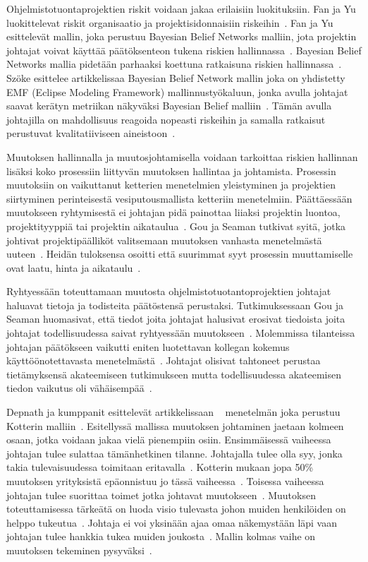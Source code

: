 \documentclass[finnish]{tktltiki2}
\theoremstyle{definition}
\theoremstyle{remark}
\begin{document}
Ohjelmistotuontaprojektien riskit voidaan jakaa erilaisiin luokituksiin. Fan ja Yu luokittelevat riskit organisaatio ja projektisidonnaisiin riskeihin~\cite{fan2004bbn}. Fan ja Yu esittelevät mallin, joka perustuu Bayesian Belief Networks malliin, jota projektin johtajat voivat käyttää päätöksenteon tukena riskien hallinnassa~\cite{fan2004bbn}. Bayesian Belief Networks mallia pidetään parhaaksi koettuna ratkaisuna riskien hallinnassa~\cite{szHokeproject}. Szöke esittelee artikkelissaa Bayesian Belief Network mallin joka on yhdistetty EMF (Eclipse Modeling Framework) mallinnustyökaluun, jonka avulla johtajat saavat kerätyn metriikan näkyväksi Bayesian Belief malliin~\cite{szHokeproject}. Tämän avulla johtajilla on mahdollisuus reagoida nopeasti riskeihin ja samalla ratkaisut perustuvat kvalitatiiviseen aineistoon~\cite{szHokeproject}.

Muutoksen hallinnalla ja muutosjohtamisella voidaan tarkoittaa riskien hallinnan lisäksi koko prosessiin liittyvän muutoksen hallintaa ja johtamista. Prosessin muutoksiin on vaikuttanut ketterien menetelmien yleistyminen ja projektien siirtyminen perinteisestä vesiputousmallista ketteriin menetelmiin. Päättäessään muutokseen ryhtymisestä ei johtajan pidä painottaa liiaksi projektin luontoa, projektityyppiä tai projektin aikataulua~\cite{Chow2008961}. Gou ja Seaman tutkivat syitä, jotka johtivat projektipäälliköt valitsemaan muutoksen vanhasta menetelmästä uuteen~\cite{Guo:2008:SSP:1414004.1414046}. Heidän tuloksensa osoitti että suurimmat syyt prosessin muuttamiselle ovat laatu, hinta ja aikataulu~\cite{Guo:2008:SSP:1414004.1414046}.

Ryhtyessään toteuttamaan muutosta ohjelmistotuotantoprojektien johtajat haluavat tietoja ja todisteita päätöstensä perustaksi. Tutkimuksessaan Gou ja Seaman huomasivat, että tiedot joita johtajat halusivat erosivat tiedoista joita johtajat todellisuudessa saivat ryhtyessään muutokseen~\cite{Guo:2008:SSP:1414004.1414046}. Molemmissa tilanteissa johtajan päätökseen vaikutti eniten luotettavan kollegan kokemus käyttöönotettavasta menetelmästä~\cite{Guo:2008:SSP:1414004.1414046}. Johtajat olisivat tahtoneet perustaa tietämyksensä akateemiseen tutkimukseen mutta todellisuudessa akateemisen tiedon vaikutus oli vähäisempää~\cite{Guo:2008:SSP:1414004.}.

Depnath ja kumppanit esittelevät artikkelissaan ~\cite{4017705} menetelmän joka perustuu Kotterin malliin~\cite{kotter1995leading}. Esitellyssä mallissa muutoksen johtaminen jaetaan kolmeen osaan, jotka voidaan jakaa vielä pienempiin osiin. Ensimmäisessä vaiheessa johtajan tulee sulattaa tämänhetkinen tilanne. Johtajalla tulee olla syy, jonka takia tulevaisuudessa toimitaan eritavalla~\cite{4017705}. Kotterin mukaan jopa 50\% muutoksen yrityksistä epäonnistuu jo tässä vaiheessa~\cite{kotter1995leading}. Toisessa vaiheessa johtajan tulee suorittaa toimet jotka johtavat muutokseen~\cite{4017705}. Muutoksen toteuttamisessa tärkeätä on luoda visio tulevasta johon muiden henkilöiden on helppo tukeutua~\cite{4017705}. Johtaja ei voi yksinään ajaa omaa näkemystään läpi vaan johtajan tulee hankkia tukea muiden joukosta~\cite{4017705}. Mallin kolmas vaihe on muutoksen tekeminen pysyväksi~\cite{4017705}.
\end{document}
